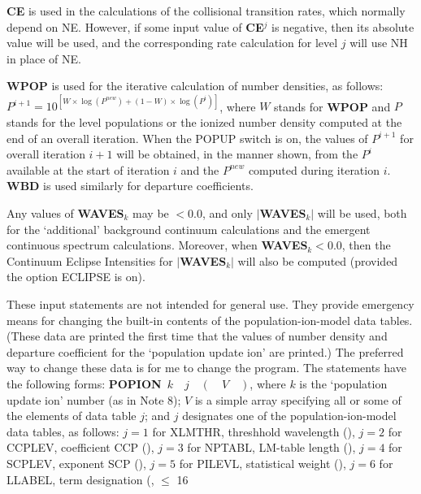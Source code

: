 \blankline
\blankline
\centerline{}
\space \noindent
{\bf CE} is used in the calculations of the collisional transition rates,
which normally depend on NE. However, if some input value of
{\bf CE}$^j$ is negative, then its absolute value will be used, and the
corresponding rate calculation for level $j$ will use NH in place of NE.
\blankline
\blankline
\centerline{}
\noindent
{\bf WPOP} is used for the iterative calculation of number densities,
as follows: \np
$ P^{i+1} = 10^{[ W \times \log(P^{new}) + (1 - W) \times \log(P^i) ]}$,
where $W$ stands for {\bf WPOP} and
$P$ stands for the level populations or the ionized number density
computed at the end of an overall iteration. 
When the POPUP switch is on, the values of $P^{i+1}$ for overall iteration
$i+1$ will be obtained, in the manner shown, from the $P^i$ available at the
start of iteration $i$ and the $P^{new}$ computed during iteration $i$. \np
{\bf WBD} is used similarly for departure coefficients.
\blankline
\blankline
\centerline{}
\space \noindent
Any values of {\bf WAVES}$_k$ may be $< 0.0$, and only $|${\bf WAVES}$_k|$
will be used, both for the `additional'
background continuum calculations and the emergent continuous spectrum
calculations. Moreover, when {\bf WAVES}$_k < 0.0$, then the Continuum
Eclipse Intensities for $|${\bf WAVES}$_k|$ will also be computed 
(provided the option ECLIPSE is on).
\ej
\centerline{}
\space \noindent
These input statements are not intended for general use. They provide
emergency means for changing the built-in contents of the population-ion-model
data tables. (These data are printed the first time that the values of
number density and departure coefficient for the `population update ion'
are printed.) The preferred way to change these data is for me to change the
program. \np
The statements have the following forms: \np
{\bf POPION} $ \, k \quad j \quad ( \quad V \quad )$, \np
where $k$ is the `population update ion' number (as in Note 8); $V$ is a simple
array specifying all or some of the elements of data table $j$; and $j$
designates one of the population-ion-model data tables, as follows:
$j = 1$ for XLMTHR, threshhold wavelength (\flpt), $j = 2$ for CCPLEV,
coefficient CCP (\flpt), $j = 3$ for NPTABL, LM-table length (\intg),
$j = 4$ for SCPLEV, exponent SCP (\flpt), $j = 5$ for PILEVL, statistical
weight (\flpt), $j = 6$ for LLABEL, term designation (\alfa, $\leq$ 16
